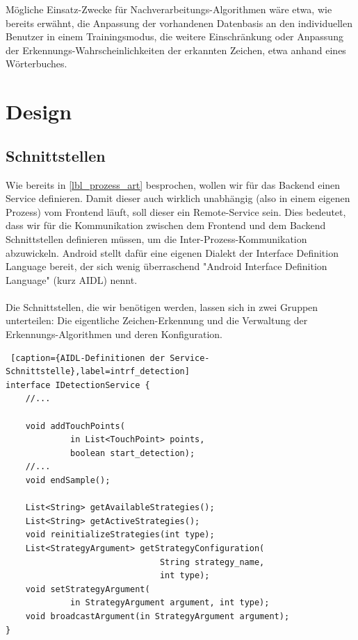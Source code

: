 Mögliche Einsatz-Zwecke für Nachverarbeitungs-Algorithmen wäre etwa, wie bereits erwähnt, die Anpassung der vorhandenen Datenbasis an den individuellen Benutzer in einem Trainingsmodus, die weitere Einschränkung oder Anpassung der Erkennungs-Wahrscheinlichkeiten der erkannten Zeichen, etwa anhand eines Wörterbuches.

\section{Design}

\subsection{Schnittstellen}

Wie bereits in \ref{lbl_prozess_art} besprochen, wollen wir für das Backend einen Service definieren. Damit dieser auch wirklich unabhängig (also in einem eigenen Prozess) vom Frontend läuft, soll dieser ein Remote-Service sein. Dies bedeutet, dass wir für die Kommunikation zwischen dem Frontend und dem Backend Schnittstellen definieren müssen, um die Inter-Prozess-Kommunikation abzuwickeln. Android stellt dafür eine eigenen Dialekt der Interface Definition Language bereit, der sich wenig überraschend "Android Interface Definition Language" (kurz AIDL) nennt.\\
\\
Die Schnittstellen, die wir benötigen werden, lassen sich in zwei Gruppen unterteilen: Die eigentliche Zeichen-Erkennung und die Verwaltung der Erkennungs-Algorithmen und deren Konfiguration.\\

\begin{lstlisting} [caption={AIDL-Definitionen der Service-Schnittstelle},label=intrf_detection]
interface IDetectionService {
    //...

    void addTouchPoints(
             in List<TouchPoint> points, 
             boolean start_detection);
    //...
    void endSample();
    
    List<String> getAvailableStrategies();
    List<String> getActiveStrategies();
    void reinitializeStrategies(int type);
    List<StrategyArgument> getStrategyConfiguration(
                               String strategy_name, 
                               int type);
    void setStrategyArgument(
             in StrategyArgument argument, int type);
    void broadcastArgument(in StrategyArgument argument);
}
\end{lstlisting}

